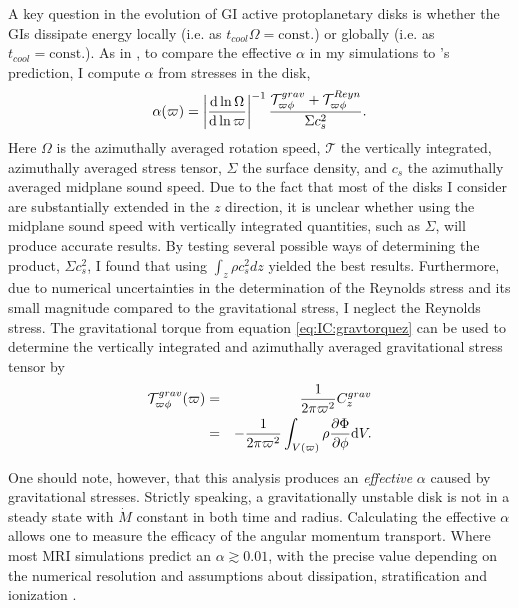A key question in the evolution of GI active protoplanetary disks is whether the GIs dissipate energy locally (i.e. as $t_{cool}\Omega = \mathrm{const.}$) or globally (i.e. as $t_{cool} = \mathrm{const.}$). As in \citet{lodato2004}, to compare the effective $\alpha$ in my simulations to \citeauthor{gammie2001}'s prediction, I compute $\alpha$ from stresses in the disk,
\begin{equation}
\alpha (\varpi ) = \left | \frac{\mathrm{d} \ln \Omega}{\mathrm{d} \ln \varpi} \right |^{-1} \frac{ \mathcal{T}^{grav}_{\varpi \phi} + \mathcal{T}^{Reyn}_{\varpi \phi} }{\Sigma c^2_s}.
\label{eq:IC:alpha}
\end{equation}
Here $\Omega$ is the azimuthally averaged rotation speed, $\mathcal{T}$ the vertically integrated, azimuthally averaged stress tensor, $\Sigma$ the surface density, and $c_s$ the azimuthally averaged midplane sound speed. Due to the fact that most of the disks I consider are substantially extended in the $z$ direction, it is unclear whether using the midplane sound speed with vertically integrated quantities, such as $\Sigma$, will produce accurate results. By testing several possible ways of determining the product, $\Sigma c_s^2$, I found that using $\int_z \rho c_s^2 dz$ yielded the best results. Furthermore, due to numerical uncertainties in the determination of the Reynolds stress and its small magnitude compared to the gravitational stress, I neglect the Reynolds stress. The gravitational torque from equation \eqref{eq:IC:gravtorquez} can be used to determine the vertically integrated and azimuthally averaged gravitational stress tensor by 
\begin{eqnarray}\label{eq:IC:tgrav}
\mathcal{T}^{grav}_{\varpi \phi} (\varpi) &=& \frac{1}{2 \pi \varpi^2}C^{grav}_z\\
&=&-\frac{1}{2 \pi \varpi^2} \int_{V(\varpi)}\rho\frac{\partial\Phi}{\partial\phi}\mathrm{d} V. \nonumber
\end{eqnarray}

One should note, however, that this analysis produces an {\it effective} $\alpha$ caused by gravitational stresses. Strictly speaking, a gravitationally unstable disk is not in a steady state with $\dot{M}$ constant in both time and radius. Calculating the effective $\alpha$ allows one to measure the efficacy of the angular momentum transport. Where most MRI simulations predict an $\alpha \gtrsim 0.01$, with the precise value depending on the numerical resolution and assumptions about dissipation, stratification and ionization \citep{fromang2007a, guan2009, davis2009,hartmann1998b}.

